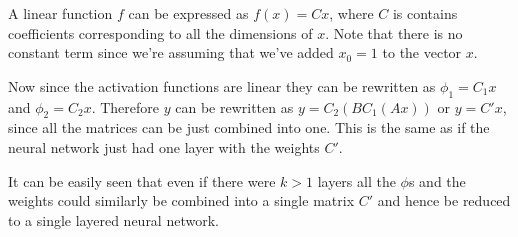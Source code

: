 \documentclass[twoside]{article}
\begin{document}
A linear function $f$ can be expressed as $f(x) = Cx$, where $C$ is contains coefficients corresponding to all the dimensions of $x$. Note that there is no constant term since we're assuming that we've added $x_0 = 1$ to the vector $x$.

Now since the activation functions are linear they can be rewritten as $\phi_1 = C_1x$ and $\phi_2 = C_2x$. Therefore $y$ can be rewritten as $y = C_2 (B C_1 (Ax))$ or $y = C'x$, since all the matrices can be just combined into one. This is the same as if the neural network just had one layer with the weights $C'$.

It can be easily seen that even if there were $k > 1$ layers all the $\phi$s and the weights could similarly be combined into a single matrix $C'$ and hence be reduced to a single layered neural network.
\end{document}
